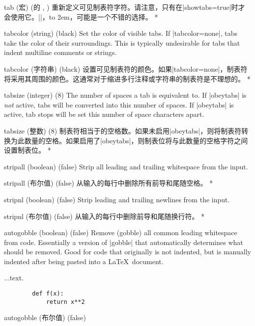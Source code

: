 \begin{optionlist}
\begin{paracol}{2}
\switchcolumn
\item[tab (宏) ({\rmfamily\pkg{fancyvrb}的} \string\FancyVerbTab, \FancyVerbTab)]
重新定义可见制表符字符。请注意，只有在|showtabs=true|时才会使用它。|\rightarrowfill|，\hbox to 2em{\rightarrowfill}，可能是一个不错的选择。
\switchcolumn[0]*%
\item[tabcolor (string) (black)]
Set the color of visible tabs.  If |tabcolor=none|, tabs take the color of their surroundings.  This is typically undesirable for tabs that indent multiline comments or strings.
\switchcolumn
\item[tabcolor (字符串) (black)]
设置可见制表符的颜色。如果|tabcolor=none|，制表符将采用其周围的颜色。这通常对于缩进多行注释或字符串的制表符是不理想的。
\switchcolumn[0]*%
\item[tabsize (integer) (8)]
The number of spaces a tab is equivalent to.  If |obeytabs| is \emph{not} active, tabs will be converted into this number of spaces.  If |obeytabs| is active, tab stops will be set this number of space characters apart.
\switchcolumn
\item[tabsize (整数) (8)]
制表符相当于的空格数。如果未启用|obeytabs|，则将制表符转换为此数量的空格。如果启用了|obeytabs|，则制表位将与此数量的空格字符之间设置制表位。
\switchcolumn[0]*%
\item[stripall (boolean) (false)]
Strip all leading and trailing whitespace from the input.
\switchcolumn
\item[stripall (布尔值) (false)]
从输入的每行中删除所有前导和尾随空格。
\switchcolumn[0]*%
\item[stripnl (boolean) (false)]
Strip leading and trailing newlines from the input.
\switchcolumn
\item[stripnl (布尔值) (false)]
从输入的每行中删除前导和尾随换行符。
\switchcolumn[0]*%
\item[autogobble (boolean) (false)]
Remove (gobble) all common leading whitespace from code.  Essentially a version of |gobble| that automatically determines what should be removed.  Good for code that originally is not indented, but is manually indented after being pasted into a \LaTeX\ document.\\
\begin{example}
    ...text.
    \begin{verbatim}
        def f(x):
            return x**2
    \end{verbatim}
\end{example}
\switchcolumn
\item[autogobble (布尔值) (false)]

\end{paracol}
\end{optionlist}
